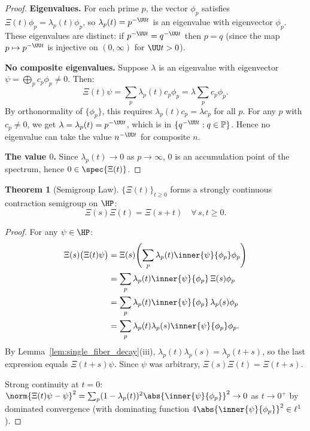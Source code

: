 \documentclass[12pt,letterpaper]{article}
\theoremstyle{definition}
\newtheorem{theorem}{Theorem}[section]
\theoremstyle{remark}
\begin{document}
\begin{proof}
\textbf{Eigenvalues.}
For each prime $p$, the vector $\phi_p$ satisfies
$\Xi(t)\phi_p = \lambda_p(t)\phi_p$, so $\lambda_p(t) = p^{-\UU t}$
is an eigenvalue with eigenvector $\phi_p$.
These eigenvalues are distinct: if $p^{-\UU t} = q^{-\UU t}$ then
$p = q$ (since the map $p \mapsto p^{-\UU t}$ is injective on $(0,\infty)$
for $\UU t > 0$).

\textbf{No composite eigenvalues.}
Suppose $\lambda$ is an eigenvalue with eigenvector
$\psi = \bigoplus_p c_p\phi_p \neq 0$. Then:
\[
  \Xi(t)\psi = \sum_p \lambda_p(t) c_p \phi_p = \lambda \sum_p c_p \phi_p.
\]
By orthonormality of $\{\phi_p\}$, this requires
$\lambda_p(t) c_p = \lambda c_p$ for all $p$.
For any $p$ with $c_p \neq 0$, we get $\lambda = \lambda_p(t) = p^{-\UU t}$,
which is in $\{q^{-\UU t} : q \in \mathbb{P}\}$.
Hence no eigenvalue can take the value $n^{-\UU t}$ for composite $n$.

\textbf{The value $0$.}
Since $\lambda_p(t) \to 0$ as $p \to \infty$, $0$ is an accumulation point
of the spectrum, hence $0 \in \spec{\Xi(t)}$.
\end{proof}

\begin{theorem}[Semigroup Law]
\label{thm:semigroup}
$\{\Xi(t)\}_{t \geq 0}$ forms a strongly continuous contraction semigroup on $\HP$:
\begin{equation}
  \Xi(s)\Xi(t) = \Xi(s+t) \quad \forall\, s,t \geq 0.
  \label{eq:semigroup}
\end{equation}
\end{theorem}

\begin{proof}
For any $\psi \in \HP$:
\begin{align*}
  \Xi(s)\bigl(\Xi(t)\psi\bigr)
  &= \Xi(s)\!\left(\sum_p \lambda_p(t)\inner{\psi}{\phi_p}\phi_p\right) \\
  &= \sum_p \lambda_p(t)\inner{\psi}{\phi_p}\,\Xi(s)\phi_p \\
  &= \sum_p \lambda_p(t)\inner{\psi}{\phi_p}\,\lambda_p(s)\phi_p \\
  &= \sum_p \lambda_p(t)\lambda_p(s)\inner{\psi}{\phi_p}\phi_p.
\end{align*}
By Lemma~\ref{lem:single_fiber_decay}(iii),
$\lambda_p(t)\lambda_p(s) = \lambda_p(t+s)$,
so the last expression equals $\Xi(t+s)\psi$. Since $\psi$ was arbitrary,
$\Xi(s)\Xi(t) = \Xi(t+s)$.

Strong continuity at $t=0$: $\norm{\Xi(t)\psi - \psi}^2
= \sum_p (1 - \lambda_p(t))^2 \abs{\inner{\psi}{\phi_p}}^2 \to 0$
as $t \to 0^+$ by dominated convergence (with dominating function
$4\abs{\inner{\psi}{\phi_p}}^2 \in \ell^1$).
\end{proof}
\end{document}
